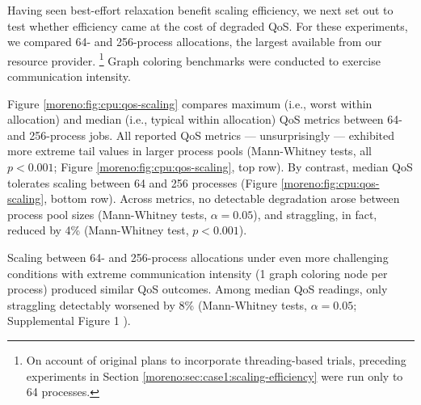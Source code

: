 Having seen best-effort relaxation benefit scaling efficiency, we next set out to test whether efficiency came at the cost of degraded QoS.
For these experiments, we compared 64- and 256-process allocations, the largest available from our resource provider.
\unskip\footnote{%
On account of original plans to incorporate threading-based trials, preceding experiments in Section \ref{moreno:sec:case1:scaling-efficiency} were run only to 64 processes.
}
Graph coloring benchmarks were conducted to exercise communication intensity.

Figure \ref{moreno:fig:cpu:qos-scaling} compares maximum (i.e., worst within allocation) and median (i.e., typical within allocation) QoS metrics between 64- and 256-process jobs.
All reported QoS metrics --- unsurprisingly --- exhibited more extreme tail values in larger process pools (Mann-Whitney tests, all $p < 0.001$; Figure \ref{moreno:fig:cpu:qos-scaling}, top row).
By contrast, median QoS tolerates scaling between 64 and 256 processes (Figure \ref{moreno:fig:cpu:qos-scaling}, bottom row).
Across metrics, no detectable degradation arose between process pool sizes (Mann-Whitney tests, $\alpha = 0.05$), and straggling, in fact, reduced by 4\% (Mann-Whitney test, $p < 0.001$).

Scaling between 64- and 256-process allocations under even more challenging conditions with extreme communication intensity (1 graph coloring node per process) produced similar QoS outcomes.
Among median QoS readings, only straggling detectably worsened by 8\% (Mann-Whitney tests, $\alpha = 0.05$; Supplemental Figure 1 \cite{moreno_2026_trust}).



